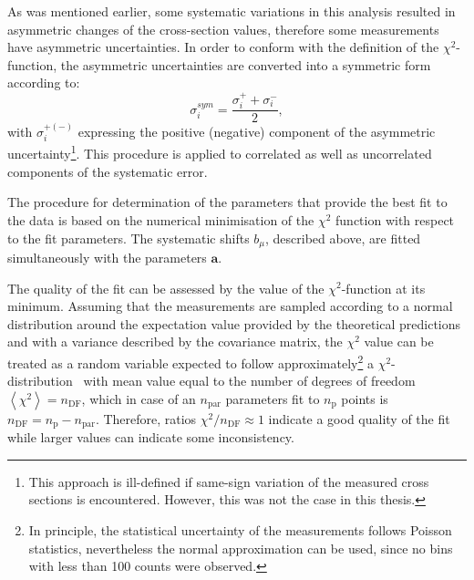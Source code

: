 As was mentioned earlier, some systematic variations in this analysis resulted in asymmetric changes of the cross-section values, therefore some measurements have asymmetric uncertainties. In order to conform with the definition of the $\chi^2$-function, the asymmetric uncertainties are converted into a symmetric form according to:
\begin{equation}
 \sigma_i^{sym} = \frac{\sigma_i^+ + \sigma_i^-}{2},
\end{equation}
with $\sigma_i^{+\left(-\right)}$ expressing the positive (negative) component of the asymmetric uncertainty\footnote{This approach is ill-defined if same-sign variation of the measured cross sections is encountered. However, this was not the case in this thesis.}. This procedure is applied to correlated as well as uncorrelated components of the systematic error.

The procedure for determination of the parameters that provide the best fit to the data is based on the numerical minimisation of the $\chi^2$ function with respect to the fit parameters. The systematic shifts $b_\mu$, described above, are fitted simultaneously with the parameters $\mathbf{a}$.

The quality of the fit can be assessed by the value of the $\chi^2$-function at its minimum. Assuming that the measurements are sampled according to a normal distribution around the expectation value provided by the theoretical predictions and with a variance described by the covariance matrix, the $\chi^2$ value can be treated as a random variable expected to follow approximately\footnote{In principle, the statistical uncertainty of the measurements follows Poisson statistics, nevertheless the normal approximation can be used, since no bins with less than 100 counts were observed.} a $\chi^2$-distri\-bu\-tion~\cite{PDG:2014}
with mean value equal to the number of degrees of freedom $\left\langle \chi^2 \right\rangle = n_\text{DF}$, which in case of an $n_\text{par}$ parameters fit to $n_\text{p}$ points is $n_\text{DF}=n_\text{p}-n_\text{par}$.
Therefore, ratios $\chi^2/n_\text{DF} \approx 1$ indicate a good quality of the fit while larger values can indicate some inconsistency.
